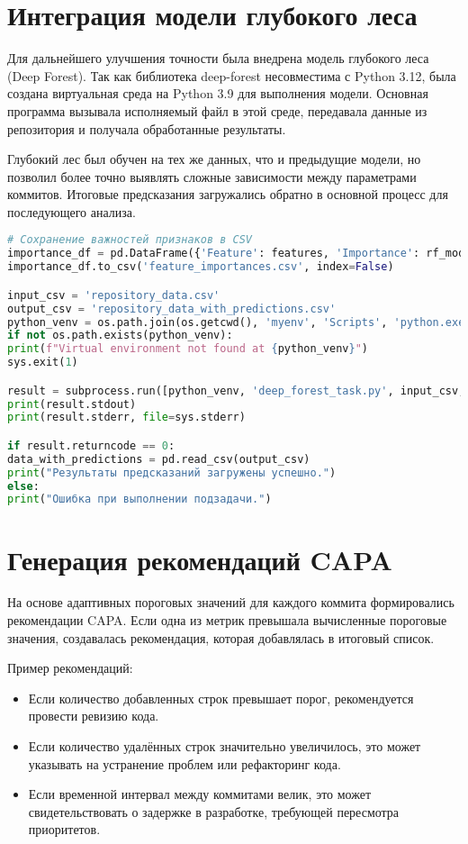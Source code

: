 \section{Интеграция модели глубокого леса} \label{ch3:sec3}

Для дальнейшего улучшения точности была внедрена модель глубокого леса (Deep Forest). Так как библиотека deep-forest несовместима с Python 3.12, была создана виртуальная среда на Python 3.9 для выполнения модели. Основная программа вызывала исполняемый файл в этой среде, передавала данные из репозитория и получала обработанные результаты.

Глубокий лес был обучен на тех же данных, что и предыдущие модели, но позволил более точно выявлять сложные зависимости между параметрами коммитов. Итоговые предсказания загружались обратно в основной процесс для последующего анализа.
\begin{lstlisting}[language=Python]
# Сохранение важностей признаков в CSV
importance_df = pd.DataFrame({'Feature': features, 'Importance': rf_model.feature_importances_})
importance_df.to_csv('feature_importances.csv', index=False)

input_csv = 'repository_data.csv'
output_csv = 'repository_data_with_predictions.csv'
python_venv = os.path.join(os.getcwd(), 'myenv', 'Scripts', 'python.exe')
if not os.path.exists(python_venv):
print(f"Virtual environment not found at {python_venv}")
sys.exit(1)

result = subprocess.run([python_venv, 'deep_forest_task.py', input_csv, output_csv], capture_output=True, text=True)
print(result.stdout)
print(result.stderr, file=sys.stderr)

if result.returncode == 0:
data_with_predictions = pd.read_csv(output_csv)
print("Результаты предсказаний загружены успешно.")
else:
print("Ошибка при выполнении подзадачи.")
\end{lstlisting}


\section{Генерация рекомендаций CAPA} \label{ch3:sec4}

На основе адаптивных пороговых значений для каждого коммита формировались рекомендации CAPA. Если одна из метрик превышала вычисленные пороговые значения, создавалась рекомендация, которая добавлялась в итоговый список. 

Пример рекомендаций:
\begin{itemize}
	\item Если количество добавленных строк превышает порог, рекомендуется провести ревизию кода.
	\item Если количество удалённых строк значительно увеличилось, это может указывать на устранение проблем или рефакторинг кода.
	\item Если временной интервал между коммитами велик, это может свидетельствовать о задержке в разработке, требующей пересмотра приоритетов.
\end{itemize}

